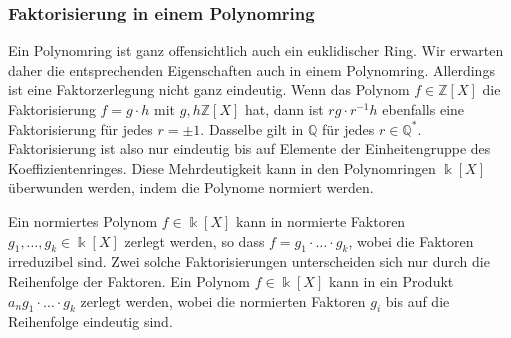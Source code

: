 \subsubsection{Faktorisierung in einem Polynomring}
Ein Polynomring ist ganz offensichtlich auch ein euklidischer Ring.
Wir erwarten daher die entsprechenden Eigenschaften auch in einem
Polynomring.
Allerdings ist eine Faktorzerlegung nicht ganz eindeutig.
Wenn das Polynom $f\in\mathbb{Z}[X]$ die Faktorisierung
$f=g\cdot h$ mit $g,h\mathbb{Z}[X]$ hat, dann
ist $rg\cdot r^{-1}h$ ebenfalls eine Faktorisierung für jedes $r =\pm1$.
Dasselbe gilt in $\mathbb{Q}$ für jedes $r\in \mathbb{Q}^*$.
Faktorisierung ist also nur eindeutig bis auf Elemente der
Einheitengruppe des Koeffizientenringes.
Diese Mehrdeutigkeit kann in den Polynomringen $\Bbbk[X]$ 
überwunden werden, indem die Polynome normiert werden.

\begin{satz}
Ein normiertes Polynom $f\in \Bbbk[X]$ kann in
normierte Faktoren $g_1,\dots,g_k\in\Bbbk[X]$ zerlegt werden, so dass
$f=g_1\cdot\ldots\cdot g_k$, wobei die Faktoren irreduzibel sind.
Zwei solche Faktorisierungen unterscheiden sich nur durch die Reihenfolge
der Faktoren.
Ein Polynom $f\in \Bbbk[X]$ kann in ein Produkt $a_n g_1\cdot\ldots\cdot g_k$
zerlegt werden, wobei die normierten Faktoren $g_i$ bis auf die Reihenfolge
eindeutig sind.
\end{satz}


